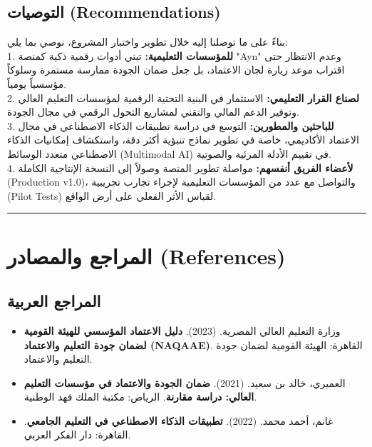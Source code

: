\documentclass[12pt, a4paper]{report}
\begin{document}
\begin{english}
{\section*{التوصيات (Recommendations)}

بناءً على ما توصلنا إليه خلال تطوير واختبار المشروع، نوصي بما يلي: \\

1. \textbf{للمؤسسات التعليمية:} تبني أدوات رقمية ذكية كمنصة "Ayn" وعدم الانتظار حتى اقتراب موعد زيارة لجان الاعتماد، بل جعل ضمان الجودة ممارسة مستمرة وسلوكاً مؤسسياً يومياً. \\
2. \textbf{لصناع القرار التعليمي:} الاستثمار في البنية التحتية الرقمية لمؤسسات التعليم العالي وتوفير الدعم المالي والتقني لمشاريع التحول الرقمي في مجال الجودة. \\
3. \textbf{للباحثين والمطورين:} التوسع في دراسة تطبيقات الذكاء الاصطناعي في مجال الاعتماد الأكاديمي، خاصة في تطوير نماذج تنبؤية أكثر دقة، واستكشاف إمكانيات الذكاء الاصطناعي متعدد الوسائط (Multimodal AI) في تقييم الأدلة المرئية والصوتية. \\
4. \textbf{لأعضاء الفريق أنفسهم:} مواصلة تطوير المنصة وصولاً إلى النسخة الإنتاجية الكاملة (Production v1.0)، والتواصل مع عدد من المؤسسات التعليمية لإجراء تجارب تجريبية (Pilot Tests) لقياس الأثر الفعلي على أرض الواقع. \\

\vspace{0.5cm}\hrule\vspace{0.5cm}

\chapter*{المراجع والمصادر (References)}

\section*{المراجع العربية}

\begin{itemize}
\item وزارة التعليم العالي المصرية. (2023). \textbf{دليل الاعتماد المؤسسي للهيئة القومية لضمان جودة التعليم والاعتماد (NAQAAE)}. القاهرة: الهيئة القومية لضمان جودة التعليم والاعتماد.
\item العميري، خالد بن سعيد. (2021). \textbf{ضمان الجودة والاعتماد في مؤسسات التعليم العالي: دراسة مقارنة}. الرياض: مكتبة الملك فهد الوطنية.
\item غانم، أحمد محمد. (2022). \textbf{تطبيقات الذكاء الاصطناعي في التعليم الجامعي}. القاهرة: دار الفكر العربي.
\end{itemize}

}
\end{english}
\end{document}
